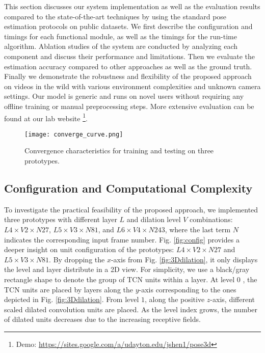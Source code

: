 \documentclass[twocolumn]{svjour3}          \smartqed  \usepackage{graphicx}
\begin{document}
This section discusses our system implementation as well as the evaluation results compared to the state-of-the-art techniques by using the standard pose estimation protocols on public datasets.  We first describe the configuration and timings for each functional module, as well as the timings for the run-time algorithm. Ablation studies of the system are conducted by analyzing each component and discuss their performance and limitations. Then we evaluate the estimation accuracy compared to other approaches as well as the ground truth. Finally we  demonstrate the robustness and flexibility of the proposed approach on videos in the wild with various environment complexities and unknown camera settings. Our model is generic and runs on novel users without requiring any offline training or manual preprocessing steps. More extensive evaluation can be found at our lab website \footnote{Demo: \url{https://sites.google.com/a/udayton.edu/jshen1/pose3d}}.

\begin{figure}[ht]
  \texttt{[image: converge\_curve.png]}
  \caption{Convergence characteristics for training and testing on three prototypes.}\label{fig:converge}
\end{figure}

\subsection{Configuration and Computational Complexity}
To investigate the practical feasibility of the proposed approach, we implemented three prototypes with different layer $L$ and dilation level $V$ combinations: $L4 \times V2 \times N27$, $L5 \times V3 \times N81$, and $L6\times V4\times N243$, where the last term $N$  indicates the corresponding input frame number. Fig. \ref{fig:config} provides a deeper insight on unit configuration of the prototypes: $L4 \times V2 \times N27$ and $L5 \times V3 \times N81$. By dropping the $x$-axis from Fig. \ref{fig:3Ddilation}, it only displays the level and layer distribute in a 2D view. For simplicity, we use a black/gray rectangle shape to denote the group of TCN units within a layer. At level $0$ , the TCN units are placed by layers along the $y$-axis corresponding to the ones depicted in Fig. \ref{fig:3Ddilation}.  From level $1$,  along the positive $z$-axis, different scaled dilated convolution units are placed. As the level index grows, the number of dilated units decreases due to the increasing receptive fields. 
\end{document}
